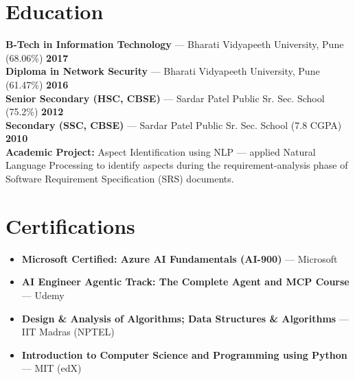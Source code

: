\documentclass[10pt,a4paper]{article}
\begin{document}
\section{Education}
\small
\noindent \textbf{B-Tech in Information Technology} --- Bharati Vidyapeeth University, Pune (68.06\%) \hfill \textbf{2017} \\
\noindent \textbf{Diploma in Network Security} --- Bharati Vidyapeeth University, Pune (61.47\%) \hfill \textbf{2016} \\
\noindent \textbf{Senior Secondary (HSC, CBSE)} --- Sardar Patel Public Sr. Sec. School (75.2\%) \hfill \textbf{2012} \\
\noindent \textbf{Secondary (SSC, CBSE)} --- Sardar Patel Public Sr. Sec. School (7.8 CGPA) \hfill \textbf{2010} \\[3pt]
\noindent \textbf{\color{primary2}Academic Project:} Aspect Identification using NLP --- applied Natural Language Processing to identify aspects during the requirement-analysis phase of Software Requirement Specification (SRS) documents.
\normalsize

\section{Certifications}
\small
\begin{itemize}
    \item \textbf{Microsoft Certified: Azure AI Fundamentals (AI-900)} --- Microsoft
    \item \textbf{AI Engineer Agentic Track: The Complete Agent and MCP Course} --- Udemy
    \item \textbf{Design \& Analysis of Algorithms; Data Structures \& Algorithms} --- IIT Madras (NPTEL)
    \item \textbf{Introduction to Computer Science and Programming using Python} --- MIT (edX)
\end{itemize}
\normalsize
\end{document}
